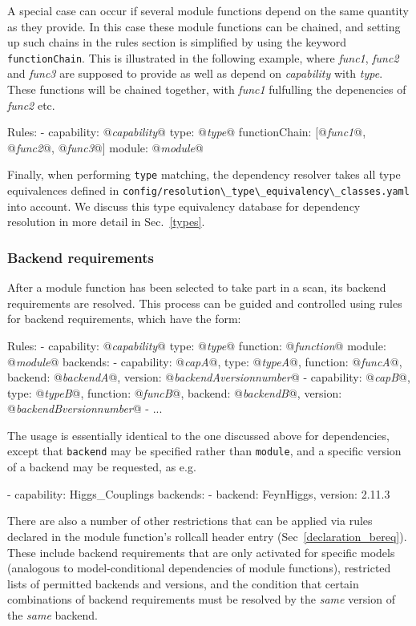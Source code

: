 \documentclass[pdftex,twocolumn,epjc3_preprint,runningheads]{svjour3}
\renewcommand{\_}{\discretionary{\underscore}{}{\underscore}}
\newcommand\yaml[1]{{\lstset{style=yaml}\lstinline!#1!\lstset{style=cpp}}}
\newcommand\term[1]{{\lstset{style=terminal}\lstinline!#1!\lstset{style=cpp}}}
\newcommand{\metavarf}[1]{\textit{\color{darkgreen}\footnotesize\textrm{#1}}}
\newcommand{\metavar}{\metavarf}
\begin{document}
A special case can occur if several module functions depend on
the same quantity as they provide.  In this case these module functions can be
chained, and setting up such chains in the rules section is simplified by using
the keyword \yaml{functionChain}.  This is illustrated in the following
example, where \metavar{func1}, \metavar{func2} and \metavar{func3} are
supposed to provide as well as depend on \metavar{capability} with
\metavar{type}.  These functions will be chained together, with \metavar{func1}
fulfulling the depenencies of \metavar{func2} etc.
\begin{lstyaml}
Rules:
  - capability: @\metavar{capability}@
    type: @\metavar{type}@
    functionChain: [@\metavar{func1}@, @\metavar{func2}@, @\metavar{func3}@]
    module: @\metavar{module}@
\end{lstyaml}

Finally, when performing \yaml{type} matching, the dependency resolver takes all type equivalences defined in \term{config/}\term{resolution\_}\term{type\_equivalency\_}\mbox{\term{classes.yaml}} into account.  We discuss this type equivalency database for dependency resolution in more detail in Sec.\ \ref{types}.

\subsubsection{Backend requirements}
\label{backend_rules}

After a module function has been selected to take part in a scan, its backend requirements are resolved.  This process can be guided and controlled using rules for backend requirements, which have the form:
\begin{lstyaml}
Rules:
  - capability: @\metavar{capability}@
    type: @\metavar{type}@
    function: @\metavar{function}@
    module: @\metavar{module}@
    backends:
    - {capability: @\metavar{cap\_A}@, type: @\metavar{type\_A}@,
       function: @\metavar{func\_A}@, backend: @\metavar{backend\_A}@,
       version: @\metavar{backend\_A\_version\_number}@}
    - {capability: @\metavar{cap\_B}@, type: @\metavar{type\_B}@,
       function: @\metavar{func\_B}@, backend: @\metavar{backend\_B}@,
       version: @\metavar{backend\_B\_version\_number}@}
    - ...
\end{lstyaml}
The usage is essentially identical to the one discussed above for dependencies, except that
\yaml{backend} may be specified rather than \yaml{module}, and a specific version of a backend may be requested, as e.g.
\begin{lstyaml}
  - capability: Higgs_Couplings
    backends:
    - {backend: FeynHiggs, version: 2.11.3}
\end{lstyaml}
There are also a number of other restrictions that can be applied via rules declared in the module function's rollcall header entry (Sec~\ref{declaration_bereq}).  These include backend requirements that are only activated for specific models (analogous to model-conditional dependencies of module functions), restricted lists of permitted backends and versions, and the condition that certain combinations of backend requirements must be resolved by the \emph{same} version of the \emph{same} backend.
\end{document}
